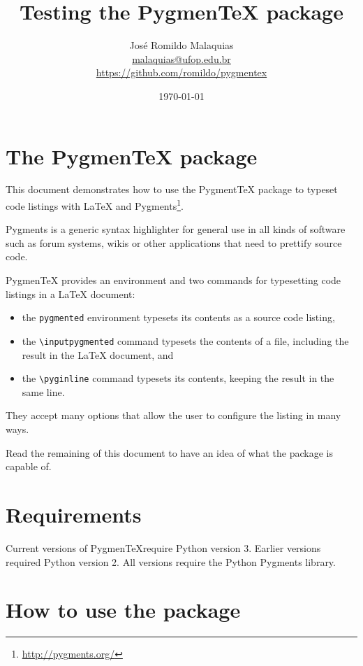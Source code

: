 \documentclass[10pt,a4paper]{article}
\begin{document}
\title{Testing the Pygmen\TeX{} package}
\author{José Romildo Malaquias\\
\href{mailto:malaquias@ufop.edu.br}{malaquias@ufop.edu.br}\\
\url{https://github.com/romildo/pygmentex}
}
\date{\today}
\maketitle

\section{The Pygmen\TeX{} package}

This document demonstrates how to use the Pygment\TeX{} package to
typeset code listings with \LaTeX{} and
Pygments\footnote{\url{http://pygments.org/}}.

Pygments is a generic syntax highlighter for general use in all kinds of
software such as forum systems, wikis or other applications that need to
prettify source code.

Pygmen\TeX{} provides an environment and two commands for typesetting code
listings in a \LaTeX{} document:
\begin{itemize}
  \item the \verb|pygmented| environment typesets its contents as a
  source code listing,
  \item the \verb|\inputpygmented| command typesets the contents of a
  file, including the result in the \LaTeX{} document, and
  \item the \verb|\pyginline| command typesets its contents, keeping the
  result in the same line.
\end{itemize}
They accept many options that allow the user to configure the listing in
many ways.

Read the remaining of this document to have an idea of what the package
is capable of.

\section{Requirements}

Current versions of Pygmen\TeX require Python version 3.  Earlier versions
required Python version 2.  All versions require the Python Pygments library.

\section{How to use the package}
\end{document}
